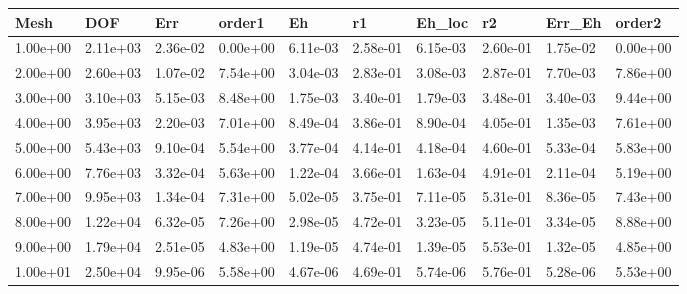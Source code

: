 \begin{tabular}{llllllllll}
Mesh & DOF & Err & order1 & Eh & r1 & Eh_loc & r2 & Err_Eh & order2 \\ 
\hline 
1.00e+00 & 2.11e+03 & 2.36e-02 & 0.00e+00 & 6.11e-03 & 2.58e-01 & 6.15e-03 & 2.60e-01 & 1.75e-02 & 0.00e+00 \\ 
2.00e+00 & 2.60e+03 & 1.07e-02 & 7.54e+00 & 3.04e-03 & 2.83e-01 & 3.08e-03 & 2.87e-01 & 7.70e-03 & 7.86e+00 \\ 
3.00e+00 & 3.10e+03 & 5.15e-03 & 8.48e+00 & 1.75e-03 & 3.40e-01 & 1.79e-03 & 3.48e-01 & 3.40e-03 & 9.44e+00 \\ 
4.00e+00 & 3.95e+03 & 2.20e-03 & 7.01e+00 & 8.49e-04 & 3.86e-01 & 8.90e-04 & 4.05e-01 & 1.35e-03 & 7.61e+00 \\ 
5.00e+00 & 5.43e+03 & 9.10e-04 & 5.54e+00 & 3.77e-04 & 4.14e-01 & 4.18e-04 & 4.60e-01 & 5.33e-04 & 5.83e+00 \\ 
6.00e+00 & 7.76e+03 & 3.32e-04 & 5.63e+00 & 1.22e-04 & 3.66e-01 & 1.63e-04 & 4.91e-01 & 2.11e-04 & 5.19e+00 \\ 
7.00e+00 & 9.95e+03 & 1.34e-04 & 7.31e+00 & 5.02e-05 & 3.75e-01 & 7.11e-05 & 5.31e-01 & 8.36e-05 & 7.43e+00 \\ 
8.00e+00 & 1.22e+04 & 6.32e-05 & 7.26e+00 & 2.98e-05 & 4.72e-01 & 3.23e-05 & 5.11e-01 & 3.34e-05 & 8.88e+00 \\ 
9.00e+00 & 1.79e+04 & 2.51e-05 & 4.83e+00 & 1.19e-05 & 4.74e-01 & 1.39e-05 & 5.53e-01 & 1.32e-05 & 4.85e+00 \\ 
1.00e+01 & 2.50e+04 & 9.95e-06 & 5.58e+00 & 4.67e-06 & 4.69e-01 & 5.74e-06 & 5.76e-01 & 5.28e-06 & 5.53e+00 \\ 
\hline 
\end{tabular}